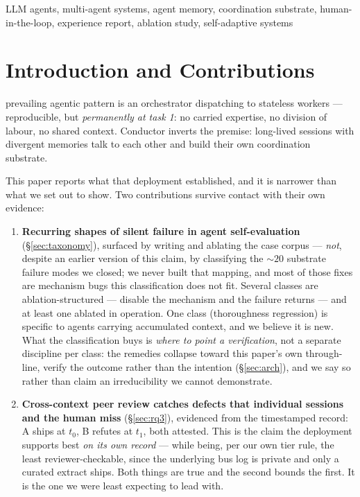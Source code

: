 \documentclass[10pt,conference]{IEEEtran}   %
\begin{document}
\begin{IEEEkeywords}
LLM agents, multi-agent systems, agent memory, coordination substrate, human-in-the-loop,
experience report, ablation study, self-adaptive systems
\end{IEEEkeywords}


\section{Introduction and Contributions}
\label{sec:intro}
 prevailing agentic pattern is an orchestrator dispatching to
stateless workers --- reproducible, but \emph{permanently at task 1}: no carried expertise,
no division of labour, no shared context. Conductor inverts the premise: long-lived sessions
with divergent memories talk to each other and build their own coordination substrate.

This paper reports what that deployment established, and it is narrower than what we set out to
show. Two contributions survive contact with their own evidence:

\begin{enumerate}
\item \textbf{Recurring shapes of silent failure in agent self-evaluation}
  (\S\ref{sec:taxonomy}), surfaced by writing and ablating the case corpus --- \emph{not}, despite an
  earlier version of this claim, by classifying the ${\sim}20$ substrate failure modes we closed; we
  never built that mapping, and most of those fixes are mechanism bugs this classification does not
  fit. Several classes are ablation-structured --- disable the mechanism and the failure returns ---
  and at least one ablated in operation. One class (thoroughness regression) is specific to agents
  carrying accumulated context, and we believe it is new. What the classification buys is
  \emph{where to point a verification}, not a separate discipline per class: the remedies collapse
  toward this paper's own through-line, verify the outcome rather than the intention
  (\S\ref{sec:arch}), and we say so rather than claim an irreducibility we cannot demonstrate.
\item \textbf{Cross-context peer review catches defects that individual sessions and the human
  miss} (\S\ref{sec:rq3}), evidenced from the timestamped record: A ships at $t_0$, B refutes at $t_1$, both
  attested. This is the claim the deployment supports best \emph{on its own record} --- while
being, per our own tier rule, the least reviewer-checkable, since the underlying bus log is private
and only a curated extract ships. Both things are true and the second bounds the first. It is the one we were least
  expecting to lead with.
\end{enumerate}
\end{document}
